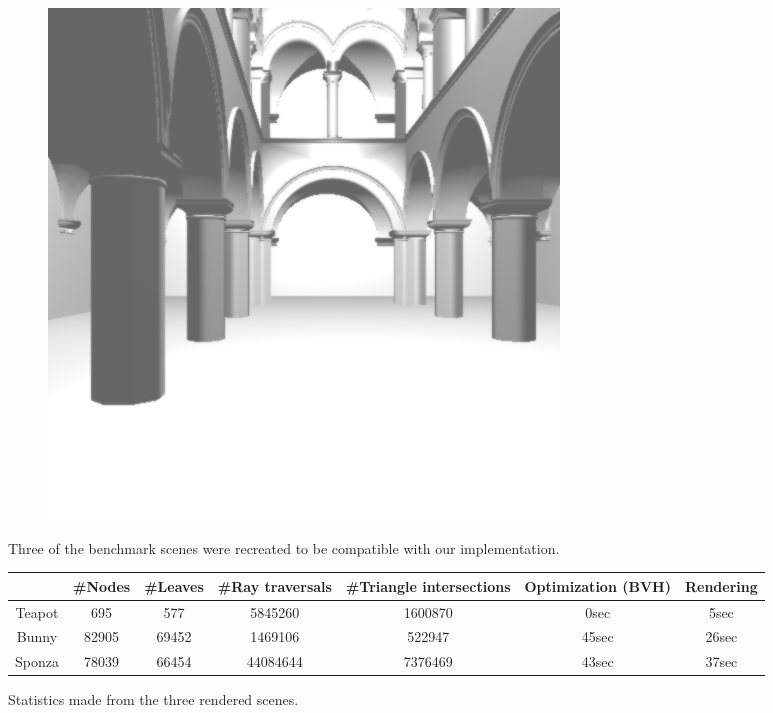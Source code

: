 \documentclass[a4paper,11pt]{article}%
\begin{document}
\begin{figure}[h]
\begin{subfigure}{.3\textwidth}
\end{subfigure} %
\begin{subfigure}{.3\textwidth}
  \centering
  \includegraphics[width=.9\linewidth]{img/benchmarksponza.png}
\end{subfigure}    
    
    \caption{Three of the benchmark scenes were recreated to be compatible with our implementation.}
    \label{fig:benchmark}
\end{figure}


\begin{figure}
\centering
\small{
\begin{tabular}{c|cccccc}
     & \#Nodes    &  \#Leaves   & \#Ray traversals    & \#Triangle intersections    & Optimization (BVH)    & Rendering   \\ \hline
  Teapot  & 695 &  577 &  5845260 &  1600870 &  0sec &  5sec \\
  Bunny  & 82905 &  69452 &  1469106 &  522947 &  45sec &  26sec \\
  Sponza  & 78039 &  66454 &  44084644 &  7376469 &  43sec &  37sec \\
  
\end{tabular}
}
    \caption{Statistics made from the three rendered scenes.}
    \label{fig:benchmarktable}
\end{figure}
\end{document}
